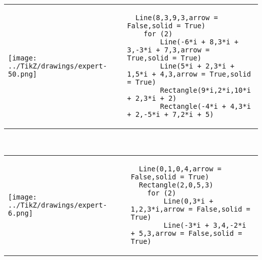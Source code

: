         \begin{tabular}{ll}
\texttt{[image: ../TikZ/drawings/expert-50.png]}&
        \begin{minipage}{10cm}
        \begin{verbatim}
  Line(8,3,9,3,arrow = False,solid = True)
    for (2)
        Line(-6*i + 8,3*i + 3,-3*i + 7,3,arrow = True,solid = True)
        Line(5*i + 2,3*i + 1,5*i + 4,3,arrow = True,solid = True)
        Rectangle(9*i,2*i,10*i + 2,3*i + 2)
        Rectangle(-4*i + 4,3*i + 2,-5*i + 7,2*i + 5)
        \end{verbatim}
\end{minipage}
\end{tabular}        
        \\

        \begin{tabular}{ll}
\texttt{[image: ../TikZ/drawings/expert-6.png]}&
        \begin{minipage}{10cm}
        \begin{verbatim}
  Line(0,1,0,4,arrow = False,solid = True)
  Rectangle(2,0,5,3)
    for (2)
        Line(0,3*i + 1,2,3*i,arrow = False,solid = True)
        Line(-3*i + 3,4,-2*i + 5,3,arrow = False,solid = True)
        \end{verbatim}
\end{minipage}
\end{tabular}        
        
